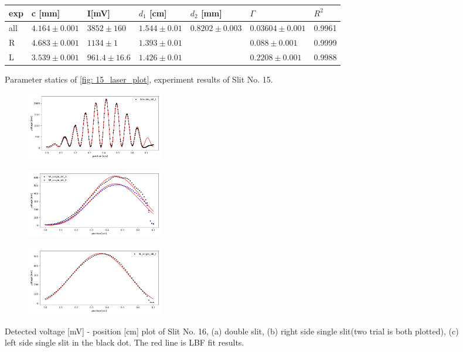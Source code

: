 \documentclass{article}
\begin{document}
\begin{figure}[H]
    \begin{tabular}{  m{0.6cm}|m{2cm}|m{1.7cm}|m{2cm}|m{2.3cm}|m{2.3cm}|m{1cm} } 
        exp & c [mm]& I[mV] & $d_1$ [cm] & $d_2$ [mm] & $\Gamma$ & $R^2$ \\ \hline \hline
        all& $4.164 \pm 0.001$& $3852 \pm 160$& $1.544 \pm 0.01$& $0.8202 \pm 0.003$& $0.03604 \pm 0.001$& 0.9961\\ \hline 
        R& $4.683 \pm 0.001$& $1134 \pm 1$& $1.393 \pm 0.01$& &$0.088 \pm 0.001$& 0.9999\\ \hline 
        L& $3.539 \pm 0.001$& $961.4 \pm 16.6$& $1.426 \pm 0.01$& &$0.2208 \pm 0.001$& 0.9988\\ \hline 
    \end{tabular}
    \caption{Parameter statics of \ref{fig: 15_laser_plot}, experiment results of Slit No. 15.}
    \label{fig: 15_laser_parmeters}
\end{figure}

\begin{figure}[H]
  \begin{subfigure}[b]{6cm}
      \centering
      \includegraphics[width=6cm]{../results/laser(5_double_slit)_modified_fig.png}
      \caption{}
  \end{subfigure}
  \hfill
  \begin{subfigure}[b]{6cm}
    \centering
    \includegraphics[width=6cm]{../results/laser(5_R_single_slit)_modified_fig.png}
    \caption{}
\end{subfigure}
\hfill
\centering
\begin{subfigure}[b]{6cm}
  \centering
  \includegraphics[width=6cm]{../results/laser(5_L_single_slit)_modified_fig.png}
  \caption{}
\end{subfigure}
\hfill
  \caption{Detected voltage [mV] - position [cm] plot of Slit No. 16, (a) double slit, (b) right side single slit(two trial is both plotted), (c) left side single slit in the black dot.
      The red line is LBF fit results.
   }
  \label{fig: 16_laser_plot}
\end{figure}
\end{document}
